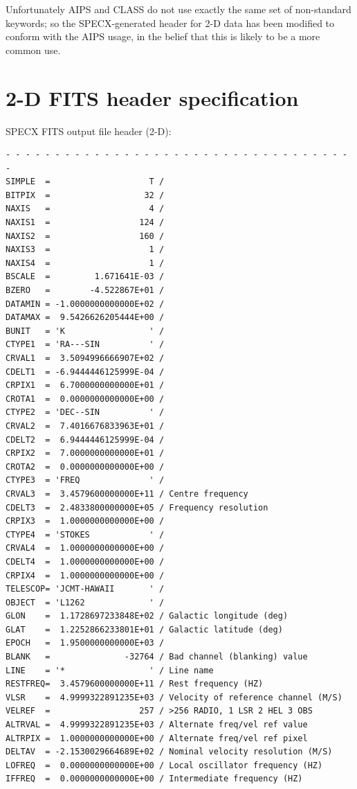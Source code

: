 \documentclass[11pt,twoside]{report}
\begin{document}
Unfortunately AIPS and CLASS do not use exactly the
same set of non-standard keywords; so the SPECX-generated header for 2-D data
has been modified to conform with the AIPS usage, in the belief that this is
likely to be a more common use. 

\section{2-D FITS header specification}

SPECX FITS output file header (2-D):
\begin{verbatim}
- - - - - - - - - - - - - - - - - - - - - - - - - - - - - - - - - - - - 
SIMPLE  =                    T /
BITPIX  =                   32 /
NAXIS   =                    4 /
NAXIS1  =                  124 /
NAXIS2  =                  160 /
NAXIS3  =                    1 /
NAXIS4  =                    1 /
BSCALE  =         1.671641E-03 /
BZERO   =        -4.522867E+01 /
DATAMIN = -1.0000000000000E+02 /
DATAMAX =  9.5426626205444E+00 /
BUNIT   = 'K                 ' /
CTYPE1  = 'RA---SIN          ' /
CRVAL1  =  3.5094996666907E+02 /
CDELT1  = -6.9444446125999E-04 /
CRPIX1  =  6.7000000000000E+01 /
CROTA1  =  0.0000000000000E+00 /
CTYPE2  = 'DEC--SIN          ' /
CRVAL2  =  7.4016676833963E+01 /
CDELT2  =  6.9444446125999E-04 /
CRPIX2  =  7.0000000000000E+01 /
CROTA2  =  0.0000000000000E+00 /
CTYPE3  = 'FREQ              ' /
CRVAL3  =  3.4579600000000E+11 / Centre frequency
CDELT3  =  2.4833800000000E+05 / Frequency resolution
CRPIX3  =  1.0000000000000E+00 /
CTYPE4  = 'STOKES            ' /
CRVAL4  =  1.0000000000000E+00 /
CDELT4  =  1.0000000000000E+00 /
CRPIX4  =  1.0000000000000E+00 /
TELESCOP= 'JCMT-HAWAII       ' /
OBJECT  = 'L1262             ' /
GLON    =  1.1728697233848E+02 / Galactic longitude (deg)
GLAT    =  1.2252866233801E+01 / Galactic latitude (deg)
EPOCH   =  1.9500000000000E+03 /
BLANK   =               -32764 / Bad channel (blanking) value
LINE    = '*                 ' / Line name
RESTFREQ=  3.4579600000000E+11 / Rest frequency (HZ)
VLSR    =  4.9999322891235E+03 / Velocity of reference channel (M/S)
VELREF  =                  257 / >256 RADIO, 1 LSR 2 HEL 3 OBS                  
ALTRVAL =  4.9999322891235E+03 / Alternate freq/vel ref value
ALTRPIX =  1.0000000000000E+00 / Alternate freq/vel ref pixel
DELTAV  = -2.1530029664689E+02 / Nominal velocity resolution (M/S)
LOFREQ  =  0.0000000000000E+00 / Local oscillator frequency (HZ)
IFFREQ  =  0.0000000000000E+00 / Intermediate frequency (HZ)

\end{verbatim}
\end{document}
